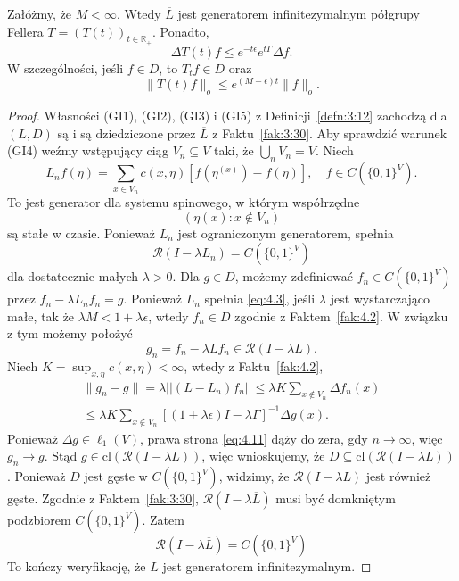 \documentclass{article}
\begin{document}
\begin{thm} \label{thm:4.3}
	Załóżmy, że $M < \infty$. 
	Wtedy $\overline{L}$ jest generatorem infinitezymalnym półgrupy 
	Fellera $T=(T(t))_{t \in \mathbb{R}_+}$. 
	Ponadto,
	\begin{equation}\label{eq:4.8}
		\Delta T(t)f \leq e^{-t \epsilon} e^{t \Gamma} \Delta f.
	\end{equation}
	W szczególności, jeśli $f \in D$, to $T_tf \in D$ oraz
	\begin{equation}\label{eq:4.9}
		\|T(t)f\|_o \leq e^{(M - \epsilon)t} \|f\|_o.
	\end{equation}
\end{thm}

\begin{proof}
	Własności (GI1), (GI2), (GI3) i (GI5) z Definicji~\ref{defn:3:12} 
	zachodzą dla $(L, D)$ są  i są dziedziczone przez $\overline{L}$ z Faktu~\ref{fak:3:30}. 
	Aby sprawdzić warunek (GI4) weźmy  wstępujący ciąg $V_n\subseteq V$ taki, że
	$\bigcup_nV_n=V$. Niech
	\begin{equation}\label{eq:4.10}
		L_n f(\eta) = 
		\sum_{x \in V_n} c(x, \eta) \left[f\left(\eta^{(x)}\right) - f(\eta)\right], 
		\quad f \in C\left(\{0,1\}^V\right).
	\end{equation}
	To jest generator dla systemu spinowego, w którym współrzędne
	\[
		(\eta(x) : x \notin V_n)
	\]
	są stałe w czasie. 
	Ponieważ $L_n$ jest ograniczonym generatorem, spełnia
	\[
		\mathcal{R}(I - \lambda L_n) = C(\{0,1\}^V)
	\]
	dla dostatecznie małych $\lambda > 0$. 
	Dla $g \in D$, możemy zdefiniować $f_n \in C(\{0,1\}^V)$ 
	przez $f_n - \lambda L_n f_n = g$. 
	Ponieważ $L_n$ spełnia \eqref{eq:4.3}, jeśli $\lambda$ jest wystarczająco małe, 
	tak że $\lambda M < 1 + \lambda \epsilon$, wtedy $f_n \in D$ zgodnie z Faktem~\ref{fak:4.2}. 
	W związku z tym możemy położyć
	\[
		g_n = f_n - \lambda L f_n \in \mathcal{R}(I - \lambda L).
	\]
	Niech $K = \sup_{x, \eta} c(x, \eta) <\infty$, wtedy z Faktu~\ref{fak:4.2},
	\begin{multline}\label{eq:4.11}
		\|g_n - g\| 
		= \lambda ||(L - L_n) f_n|| 
		\leq \lambda K \sum_{x \notin V_n} \Delta f_n(x)\\
		\leq \lambda K \sum_{x \notin V_n} 
		\left[ (1 + \lambda \epsilon)I - \lambda \Gamma \right]^{-1} \Delta g(x).
	\end{multline}
	Ponieważ $\Delta g \in \ell_1(V)$, prawa strona \eqref{eq:4.11} 
	dąży do zera, gdy $n \to \infty$, więc $g_n \to g$. 
	Stąd $g \in \mathrm{cl}(\mathcal{R}(I - \lambda L))$, więc wnioskujemy, 
	że $D \subseteq \mathrm{cl}(\mathcal{R}(I - \lambda L))$. 
	Ponieważ $D$ jest gęste w $C(\{0,1\}^V)$, 
	widzimy, że $\mathcal{R}(I - \lambda L)$ jest również gęste. 
	Zgodnie z Faktem~\ref{fak:3:30}, 
	$\mathcal{R}(I - \lambda \overline{L})$ musi być domkniętym podzbiorem  $C(\{0,1\}^V)$.
	Zatem
	\[
		\mathcal{R}(I - \lambda \overline{L}) = C(\{0,1\}^V)
	\]
	To kończy weryfikację, że $\overline{L}$ jest generatorem infinitezymalnym.



\end{proof}
\end{document}
